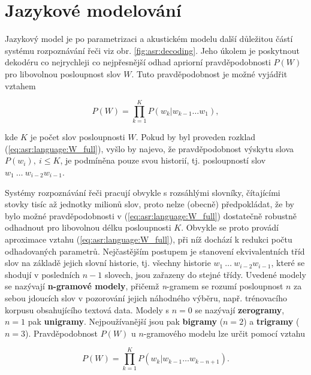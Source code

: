 \section{Jazykové modelování}
\label{chap:asr:language}

Jazykový model je po parametrizaci a akustickém modelu další důležitou částí systému rozpoznávání řeči viz obr. \ref{fig:asr:decoding}. Jeho úkolem je poskytnout dekodéru co nejrychleji co nejpřesnější odhad apriorní pravděpodobnosti $P\left(W\right)$ pro libovolnou posloupnost slov $W$. Tuto pravděpodobnost je možné vyjádřit vztahem

\begin{equation}
  P\left(W\right) = \prod_{k=1}^{K} P\left(w_k | w_{k-1}\dots w_{1}\right),
  \label{eq:asr:language:W_full}
\end{equation}

\noindent kde $K$ je počet slov posloupnosti $W$. Pokud by byl proveden rozklad (\ref{eq:asr:language:W_full}), vyšlo by najevo, že pravděpodobnost výskytu slova $P\left(w_i\right),\ i \leq K$, je podmíněna pouze svou historií, tj. posloupností slov $w_1\ \dots\ w_{i-2}w_{i-1}$.

Systémy rozpoznávání řeči pracují obvykle s rozsáhlými slovníky, čítajícími stovky tisíc až jednotky milionů slov, proto nelze (obecně) předpokládat, že by bylo možné pravděpodobnosti v (\ref{eq:asr:language:W_full}) dostatečně robustně odhadnout pro libovolnou délku posloupnosti $K$.
Obvykle se proto provádí aproximace vztahu (\ref{eq:asr:language:W_full}), při níž dochází k redukci počtu odhadovaných parametrů. Nejčastějším postupem je stanovení ekvivalentních tříd slov na základě jejich slovní historie, tj. všechny historie $w_1\ \dots\ w_{i-2}w_{i-1}$, které se shodují v posledních $n-1$ slovech, jsou zařazeny do stejné třídy. Uvedené modely se nazývají \textbf{n-gramové modely}, přičemž \textit{n}-gramem se rozumí posloupnost $n$ za sebou jdoucích slov v pozorování jejich náhodného výběru, např. trénovacího korpusu obsahujícího textová data. Modely s $n=0$ se nazývají \textbf{zerogramy}, $n=1$ pak \textbf{unigramy}. Nejpoužívanější jsou pak \textbf{bigramy} ($n=2$) a \textbf{trigramy} ($n=3$). Pravděpodobnost $P\left(W\right)$ u $n$-gramového modelu lze určit pomocí vztahu

\begin{equation}
  P\left(W\right) = \prod_{k=1}^{K} P\left(w_k | w_{k-1}\dots w_{k-n+1}\right).
  \label{eq:asr:language:W}
\end{equation}

